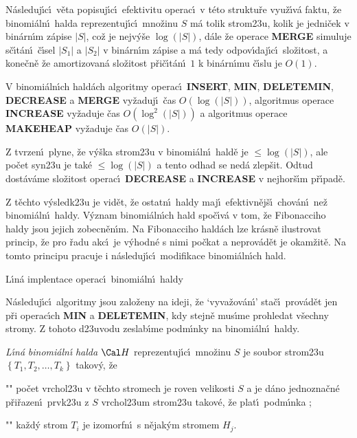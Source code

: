 \flushpar N\'asleduj\'\i c\'\i\ v\v eta popisuj\'\i c\'\i\ efektivitu operac\'\i\ v 
t\'eto struktu\v re vyu\v z\'\i v\'a faktu, \v ze binomi\'aln\'\i\ halda 
reprezentuj\'\i c\'\i\ mno\v zinu $S$ m\'a tolik strom\accent23u, 
kolik je jedni\v cek v bin\'arn\'\i m z\'apise $|S|$, co\v z je nejv\'y\v se 
$\log\left(|S|\right)$, d\'ale \v ze operace {\bf MERGE} simuluje s\v c\'\i t\'an\'\i\ 
\v c\'\i sel $|S_1|$ a $|S_2|$ v bin\'arn\'\i m z\'apise 
a m\'a tedy odpov\'\i daj\'\i c\'\i\ slo\v zitost, 
a kone\v cn\v e \v ze amortizovan\'a slo\v zitost p\v ri\v c\'\i t\'an\'\i\ $
1$ k 
bin\'arn\'\i mu \v c\'\i slu je $O\left(1\right)$. 
\medskip

V binomi\'aln\'\i ch hald\'ach algoritmy operac\'\i\ 
{\bf IN\-SERT}, {\bf MIN}, {\bf DELETEMIN}, {\bf DECREASE} a {\bf MERGE} vy\-\v za\-duj\'\i\ \v cas 
$O\left(\log\left(|S|\right)\right)$, algoritmus operace {\bf INCRE\-ASE} vy\-\v za\-duje \v cas 
$O\left(\log^2\left(|S|\right)\right)$ a algoritmus ope\-race {\bf MAKEHEAP} vy\v zaduje \v cas 
$O\left(|S|\right)$.  
\endproclaim

\flushpar Z tvrzen\'\i\ plyne, \v ze v\'y\v ska strom\accent23u v 
binomi\'aln\'\i\ hald\v e je $\le\log\left(|S|\right)$, ale po\v cet syn\accent23u je 
tak\'e $\le\log\left(|S|\right)$ a tento odhad se ned\'a zlep\v sit. Odtud 
dost\'av\'ame slo\v zitost operac\'\i\ {\bf DECREASE} a {\bf INCREASE} v nejhor\v s\'\i m p\v r\'\i pad\v e.
\medskip

\flushpar Z t\v echto v\'ysledk\accent23u je vid\v et, \v ze ostatn\'\i\ 
haldy maj\'\i\ efektivn\v ej\v s\'\i\ chov\'an\'\i\ ne\v z binomi\'aln\'\i\ haldy. 
V\'yznam binomi\'aln\'\i ch hald spo\-\v c\'\i\-v\'a v tom, \v ze Fibonacciho 
haldy jsou jejich zobecn\v en\'\i m. Na Fibonacciho hald\'ach lze kr\'asn\v e 
ilustrovat princip, \v ze pro \v radu akc\'\i\ je v\'yhodn\'e s nimi po\v ckat 
a neprov\'ad\v et je okam\v zit\v e. Na tomto principu pracuje i 
n\'asleduj\'\i c\'\i\ modifikace binomi\'aln\'\i ch hald.
\bigskip

\subhead
L\'\i n\'a implentace operac\'\i\ binomi\'aln\'\i\ haldy
\endsubhead
\smallskip

\flushpar N\'asleduj\'\i c\'\i\ algoritmy jsou zalo\v zeny na ideji, \v ze 
`vyva\v zov\'an\'\i ' sta\v c\'\i\ prov\'ad\v et jen p\v ri operac\'\i ch {\bf MIN} a 
{\bf DELETEMIN}, kdy stejn\v e mus\'\i me prohledat v\v sechny 
stromy. Z tohoto d\accent23uvodu zeslab\'\i me podm\'\i nky na 
binomi\'aln\'\i\ haldy.
\medskip

\flushpar\emph{L\'\i n\'a} \emph{binomi\'aln\'\i} \emph{halda} $\Cal H$ 
reprezentuj\'\i c\'\i\ mno\v zinu $S$ je soubor strom\accent23u 
$\left\{T_1,T_2,\dots,T_k\right\}$ tako\-v\'y, \v ze  
\roster
\item"{}"
po\v cet vrchol\accent23u v t\v echto stromech je roven 
velikosti $S$ a 
je d\'ano jednozna\v cn\'e p\v ri\v razen\'\i\ prvk\accent23u 
z $S$ vrchol\accent23um strom\accent23u tako\-v\'e, \v ze plat\'\i\ 
podm\'\i nka ;
\item"{}"
ka\v zd\'y strom $T_i$ je izomorfn\'\i\ s n\v ejak\'ym stromem $H_
j$.
\endroster


